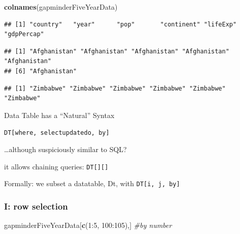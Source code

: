 \documentclass[]{article}
\newenvironment{Shaded}{\begin{snugshade}}{\end{snugshade}}
\newcommand{\KeywordTok}[1]{\textcolor[rgb]{0.13,0.29,0.53}{\textbf{{#1}}}}
\newcommand{\DecValTok}[1]{\textcolor[rgb]{0.00,0.00,0.81}{{#1}}}
\newcommand{\CommentTok}[1]{\textcolor[rgb]{0.56,0.35,0.01}{\textit{{#1}}}}
\newcommand{\NormalTok}[1]{{#1}}
\begin{document}
\begin{Shaded}
\begin{Highlighting}[]
\KeywordTok{colnames}\NormalTok{(gapminderFiveYearData)}
\end{Highlighting}
\end{Shaded}

\begin{verbatim}
## [1] "country"   "year"      "pop"       "continent" "lifeExp"   "gdpPercap"
\end{verbatim}

\begin{Shaded}
\end{Shaded}

\begin{verbatim}
## [1] "Afghanistan" "Afghanistan" "Afghanistan" "Afghanistan" "Afghanistan"
## [6] "Afghanistan"
\end{verbatim}

\begin{Shaded}
\end{Shaded}

\begin{verbatim}
## [1] "Zimbabwe" "Zimbabwe" "Zimbabwe" "Zimbabwe" "Zimbabwe" "Zimbabwe"
\end{verbatim}

Data Table has a ``Natural'' Syntax

\texttt{DT{[}where,\ select\textbar{}update\textbar{}do,\ by{]}}

\ldots{}although suspiciously similar to SQL?

it allows chaining queries: \texttt{DT{[}{]}{[}{]}}

Formally: we subset a datatable, Dt, with \texttt{DT{[}i,\ j,\ by{]}}

\subsubsection{I: row selection}\label{i-row-selection}

\begin{Shaded}
\begin{Highlighting}[]
\NormalTok{gapminderFiveYearData[}\KeywordTok{c}\NormalTok{(}\DecValTok{1}\NormalTok{:}\DecValTok{5}\NormalTok{, }\DecValTok{100}\NormalTok{:}\DecValTok{105}\NormalTok{),] }\CommentTok{#by number}
\end{Highlighting}
\end{Shaded}
\end{document}
